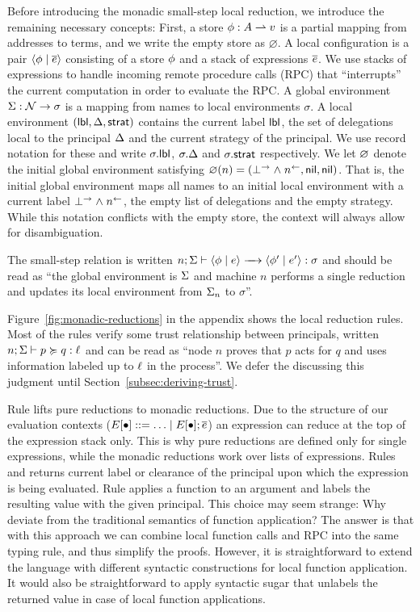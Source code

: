 Before introducing the monadic small-step local reduction, we introduce the remaining necessary concepts: First, a store $\phi: A \rightharpoonup v$ is a partial mapping from addresses to terms, and we write the empty store as $\varnothing$. A local configuration is a pair $\langle \phi \mid \overline{e} \rangle$ consisting of a store $\phi$ and a stack of expressions $\overline{e}$. We use stacks of expressions to handle incoming remote procedure calls (RPC) that ``interrupts'' the current computation in order to evaluate the RPC. A global environment $\Sigma: \mathcal{N} \to \sigma$ is a mapping from names to local environments $\sigma$. A local environment $(\mathsf{lbl}, \Delta, \mathsf{strat})$ contains the current label $\mathsf{lbl}$, the set of delegations local to the principal $\Delta$ and the current strategy of the principal. We use record notation for these and write $\sigma.\mathsf{lbl}$, $\sigma.\Delta$ and $\sigma.\mathsf{strat}$ respectively. We let $\varnothing$ denote the initial global environment satisfying $\varnothing(n) = (\bot^{\rightarrow} \mathrel{\land} n^{\leftarrow}, \mathsf{nil}, \mathsf{nil})$. That is, the initial global environment maps all names to an initial local environment with a current label $\bot^{\rightarrow} \mathrel{\land} n^{\leftarrow}$, the empty list of delegations and the empty strategy. While this notation conflicts with the empty store, the context will always allow for disambiguation.

The small-step relation is written $\step{n; \env}{\config{\store}{\expr}}{\config{\store'}{\expr'}}{\sigma}$ and should be read as ``the global environment is $\Sigma$ and machine $n$ performs a single reduction and updates its local environment from $\Sigma_n$ to $\sigma$''.

Figure~\ref{fig:monadic-reductions} in the appendix shows the local reduction rules. Most of the rules verify some trust relationship between principals, written $n; \Sigma \vdash p \succcurlyeq q : \ell$ and can be read as ``node $n$ proves that $p$ acts for $q$ and uses information labeled up to $\ell$ in the process''. We defer the discussing this judgment until Section~\ref{subsec:deriving-trust}.

Rule  lifts pure reductions to monadic reductions. Due to the structure of our evaluation contexts ($E \lbrack \bullet \rbrack ::= \ldots \mid E \lbrack \bullet \rbrack ; \overline{e}$) an expression can reduce at the top of the expression stack only. This is why pure reductions are defined only for single expressions, while the monadic reductions work over lists of expressions. Rules  and  returns current label or clearance of the principal upon which the expression is being evaluated. Rule  applies a function to an argument and labels the resulting value with the given principal. This choice may seem strange: Why deviate from the traditional semantics of function application? The answer is that with this approach we can combine local function calls and RPC into the same typing rule, and thus simplify the proofs. However, it is straightforward to extend the language with different syntactic constructions for local function application. It would also be straightforward to apply syntactic sugar that unlabels the returned value in case of local function applications.


